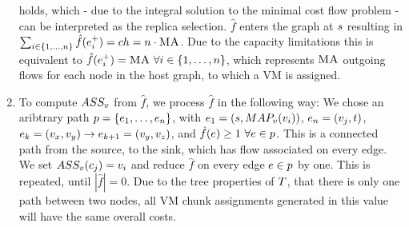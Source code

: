 \begin{enumerate}
holds, which - due to the integral solution to the minimal cost flow problem -  
can be interpreted as the replica selection. $\hat f$ enters the graph at 
$s$ resulting in $\sum_{i \in \{1,\dots,n\}}\hat f(e_i^+) 
= ch = n \cdot \textsc{MA}$. Due to the capacity limitations this is 
equivalent to $\hat f(e_i^+) = \textsc{MA} ~ \forall i \in 
\{1,\dots, n\}$, which represents $\textsc{MA}$ outgoing flows for each node 
in the host graph, to which a VM is assigned.
\item To compute $ASS_v$ from $\hat f$, we process $\hat f$ in the 
following way: We chose an aribtrary path $p = 
\{e_{1}, \dots, e_{n}\}$, with $e_{1} = 
(s, MAP_v(v_i))$, $e_{n} = 
(v_j, t)$, $e_k= (v_x, 
v_y) \rightarrow e_{k+1} = (v_y, 
v_z)$, and $\hat f(e)\geq 1 ~ \forall e 
\in p$. This is a connected path from the source, to the sink, which has 
flow associated on every edge. We set $ASS_v(c_j) = 
v_i$ and reduce $\hat f$ on every edge $e \in p$ by 
one. This is repeated, until $|\hat f| = 0$. Due to the tree properties of 
$T$, that there is only one path between two nodes, all VM chunk 
assignments generated in this value will have the same overall costs.


\end{enumerate}
